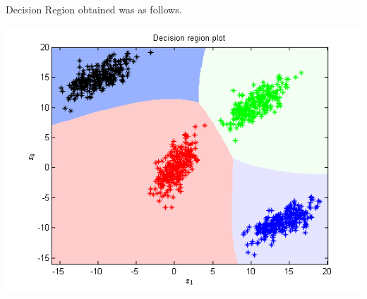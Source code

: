 \documentclass{article}
\begin{document}
Decision Region obtained was as follows.
\begin{center}
\includegraphics[scale=0.8]{Classification/1a/c_poly/dec}
\end{center}
\end{document}
